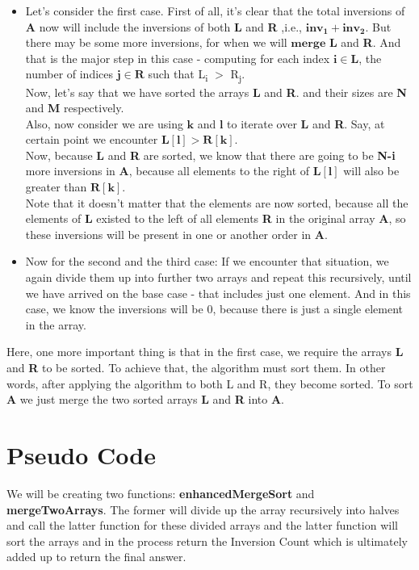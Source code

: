 \documentclass[conference]{IEEEtran}
\begin{document}
\begin{itemize}
    \item Let's consider the first case. First of all, it's clear that the total inversions of \textbf{A} now will include the inversions of both \textbf{L} and \textbf{R} ,i.e., $\bm{inv_1} + \bm{inv_2}$. But there may be some more inversions, for when we will $\bm{merge}$ \textbf{L} and \textbf{R}. And that is the major step in this case - computing for each index $\bm{i \in L}$, the number of indices $\bm{j \in R}$ such that L\textsubscript i $>$ R\textsubscript j.\\
    Now, let's say that we have sorted the arrays \textbf{L} and \textbf{R}. and their sizes are \textbf{N} and \textbf{M} respectively. \\
    Also, now consider we are using $\bm{k}$ and $\bm{l}$ to iterate over \textbf{L} and \textbf{R}. Say, at certain point we encounter $\bm{L[l]} > \bm{R[k]}$.\\
    Now, because \textbf{L} and \textbf{R} are sorted, we know that there are going to be \textbf{N-i} more inversions in \textbf{A}, because all elements to the right of $\bm{L[l]}$ will also be greater than $\bm{R[k]}$.\\
    Note that it doesn't matter that the elements are now sorted, because all the elements of \textbf{L} existed to the left of all elements \textbf{R} in the original array \textbf{A}, so these inversions will be present in one or another order in \textbf{A}.
    \\
    \item Now for the second and the third case: If we encounter that situation, we again divide them up into further two arrays and repeat this recursively, until we have arrived on the base case - that includes just one element. And in this case, we know the inversions will be $0$, because there is just a single element in the array.
\end{itemize}

Here, one more important thing is that in the first case, we require the arrays \textbf{L} and \textbf{R} to be sorted. To achieve that, the algorithm must sort them. In other words, after applying the algorithm to both L and R, they become sorted. To sort \textbf{A} we just merge the two sorted arrays \textbf{L} and \textbf{R} into \textbf{A}.

\section{\textbf{Pseudo Code}}
\noindent We will be creating two functions: \textbf{enhancedMergeSort} and \textbf{mergeTwoArrays}. The former will divide up the array recursively into halves and call the latter function for these divided arrays and the latter function will sort the arrays and in the process return the Inversion Count which is ultimately added up to return the final answer.
\end{document}
